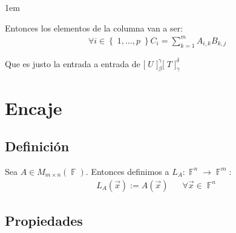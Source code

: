 \documentclass[12pt, fleqn]{report}                             %
\newenvironment{SmallIndentation}[1][0.75em]                    %
        {\begin{adjustwidth}{#1}{}\begin{footnotesize}}             %
        {\end{footnotesize}\end{adjustwidth}}                       %
\DeclareMathOperator \Space     {\quad}                         %
\theoremstyle{break}                                            %
\DeclareMathOperator \GenericField {\mathbb{F}}                 %
\newcommand{\Set}[1]            {\left\{ \; #1 \; \right\}}     %
\newcommand{\bigBrackets}[1]    {\big[ \; #1 \; \big]}          %
\begin{document}
\begin{itemize}
\begin{SmallIndentation}[1em]
                            Entonces los elementos de la columna van a ser:
                            \begin{align*}
                                \forall i \in \Set{ 1, \dots, p } C_i = \sum_{k = 1}^m A_{i, k} B_{k, j}
                            \end{align*}

                            Que es justo la entrada a entrada de $\bigBrackets{U}_\beta^\gamma \bigBrackets{T}_\gamma^\delta$


                        
                        \end{SmallIndentation}
                            


                \end{itemize}



        \clearpage
        \section{Encaje}

            \subsection{Definición}

                Sea $A \in M_{m \times n}(\GenericField)$.
                Entonces definimos a $L_A: \GenericField^n \to \GenericField^m$:
                \begin{align*}
                    L_A(\vec x) := A(\vec x) \Space \forall \vec x \in \GenericField^n 
                \end{align*}





            \vspace{1em}
            \subsection{Propiedades}
\end{document}

